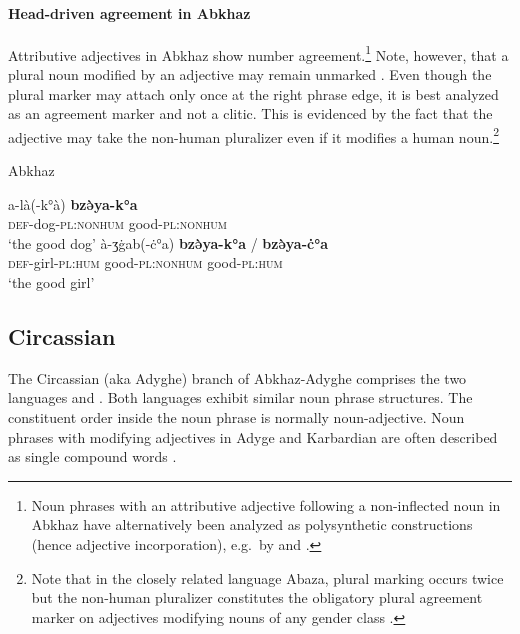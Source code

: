 \paragraph{Head-driven agreement in Abkhaz}
Attributive adjectives in Abkhaz show number agreement.\footnote{Noun phrases with an attributive adjective following a non-inflected noun in Abkhaz have alternatively been analyzed as polysynthetic constructions (hence adjective incorporation), e.g.~by \citet[123]{rijkhoff2002} and \citet{gil2005}.} Note, however, that a plural noun modified by an adjective may remain unmarked \citep[46]{hewitt1989a}. Even though the plural marker may attach only once at the right phrase edge, it is best analyzed as an agreement marker and not a clitic. This is evidenced by the fact that the adjective may take the non-human pluralizer even if it modifies a human noun.\footnote{Note that in the closely related language Abaza, plural marking occurs twice but the non-human pluralizer constitutes the obligatory plural agreement marker on adjectives modifying nouns of any gender class \cite[100]{lomtatidze-etal1989}.}
\begin{exe}
\ex \rm{Abkhaz \citep{hewitt1989a}}
\begin{xlist}
\ex
\gll	a-là(-k°à) \textbf{bzə̀ya-k°a}\\
	\textsc{def}-dog-\textsc{pl:nonhum} good-\textsc{pl:nonhum}\\
\glt	‘the good dog’
\ex	
\gll	à-ʒġab(-ċ°a) \textbf{bzə̀ya-k°a} / \textbf{bzə̀ya-ċ°a}\\
	\textsc{def}-girl-\textsc{pl:hum} good-\textsc{pl:nonhum} {} good-\textsc{pl:hum}\\
\glt	‘the good girl’
\end{xlist}
\end{exe}

\subsection{Circassian}
The Circassian (aka Adyghe) branch of Abkhaz-Adyghe comprises the two languages  and . Both languages exhibit similar noun phrase structures. The constituent order inside the noun phrase is normally noun-adjective. Noun phrases with modifying adjectives in Adyge and Karbardian are often described as single compound words \citep[222]{comrie1981}.

